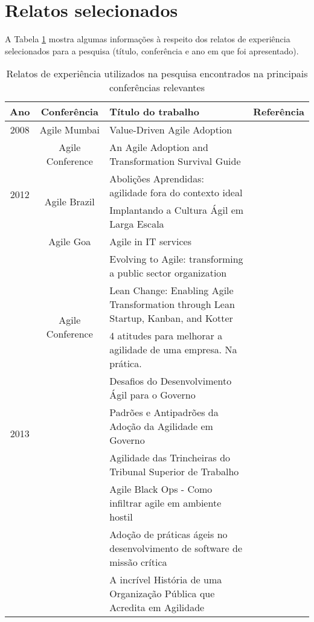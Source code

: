 	\section{Relatos selecionados}
		A Tabela \ref{tab:relatosEncontrados} mostra algumas informações à respeito dos relatos de experiência selecionados para a pesquisa (título, conferência e ano em que foi apresentado).
		\begin{table}[h]
			\centering
			\captionsetup{justification=centering,margin=1cm}
			\begin{tabular}{| c | c | m{8cm} | m{2.5cm} |} \hline \textbf{Ano} & \textbf{Conferência}  & \textbf{Título do trabalho} & \textbf{Referência} \\ \hline
				\multirow{1}{*}{2008}
					& Agile Mumbai & Value-Driven Agile Adoption & \cite{Ahmed2008} \\ \cline{2-4}
				\hline \hline
				\multirow{4}{*}{2012}
					& \multirow{1}{*}{Agile Conference}
						& An Agile Adoption and Transformation Survival Guide & \cite{Sahota2012} \\ \cline{2-4}
					& \multirow{2}{*}{Agile Brazil}
						& Abolições Aprendidas: agilidade fora do contexto ideal & \cite{Piegas2012} \\ \cline{3-4}
						&& Implantando a Cultura Ágil em Larga Escala & \cite{Parzinello2012} \\ \cline{2-4}
					& \multirow{1}{*}{Agile Goa}
						& Agile in IT services & \cite{Srinath2012} \\ \cline{2-4}
				\hline \hline
				\multirow{18}{*}{2013}
					& \multirow{4}{*}{Agile Conference}
						& Evolving to Agile: transforming a public sector organization & \cite{Karaj2013} \\ \cline{3-4}
						&& Lean Change: Enabling Agile Transformation through Lean Startup, Kanban, and Kotter & \cite{Hui2013} \\ \cline{2-4}
					& \multirow{12}{*}{Agile Brazil}
						& 4 atitudes para melhorar a agilidade de uma empresa. Na prática. & \cite{Valerio2013} \\ \cline{3-4}
						&& Desafios do Desenvolvimento Ágil para o Governo & \cite{Stefano2013} \\ \cline{3-4}
						&& Padrões e Antipadrões da Adoção da Agilidade em Governo & \cite{Rodrigues2013} \\ \cline{3-4}
						&& Agilidade das Trincheiras do Tribunal Superior de Trabalho & \cite{Vieira2013} \\ \cline{3-4}
						&& Agile Black Ops - Como infiltrar agile em ambiente hostil & \cite{Queiroz2013} \\ \cline{3-4}
						&& Adoção de práticas ágeis no desenvolvimento de software de missão crítica & \cite{Bastos2013} \\ \cline{3-4}
						&& A incrível História de uma Organização Pública que Acredita em Agilidade & \cite{Maciel2013} \\ \cline{2-4}
				\hline
			\end{tabular}
			\caption{Relatos de experiência utilizados na pesquisa encontrados na principais conferências relevantes}
			\label{tab:relatosEncontrados}
		\end{table}
